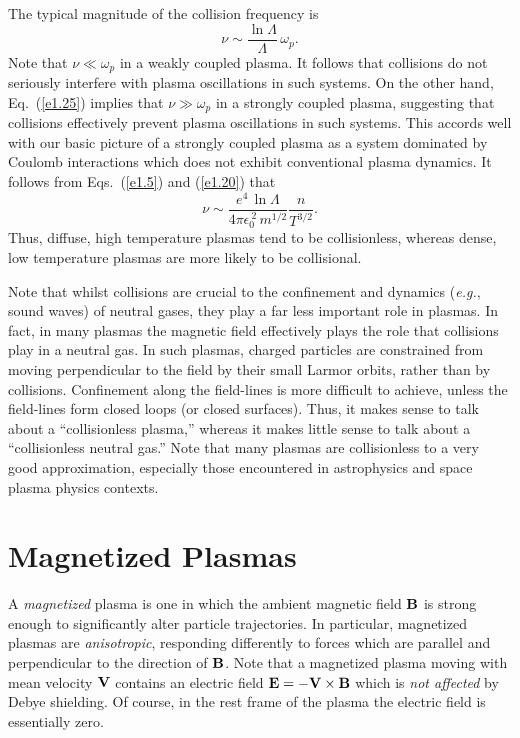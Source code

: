The typical magnitude of the collision frequency is
\begin{equation}\label{e1.25}
\nu \sim \frac{\ln{\Lambda}}{{\Lambda}}\,\omega_p.
\end{equation}
Note that $\nu\ll \omega_p$ in a weakly coupled plasma. It follows that
collisions do not seriously interfere with plasma oscillations in such systems.
On the other hand, Eq.~(\ref{e1.25}) implies that $\nu\gg \omega_p$ in a strongly
coupled plasma, suggesting that collisions effectively prevent plasma
oscillations in such systems. This accords well with our basic picture of a strongly
coupled plasma as a system 
dominated by Coulomb interactions which does not exhibit conventional
plasma dynamics.
It follows from Eqs.~(\ref{e1.5}) and (\ref{e1.20}) that
\begin{equation}
\nu \sim \frac{e^4\,\ln{\Lambda}}{4\pi\epsilon_0^{~2}\, m^{1/2}}
\frac{n}{T^{3/2}}.
\end{equation}
Thus, diffuse, high temperature plasmas tend to be collisionless, whereas dense,
low temperature plasmas are more likely to be collisional. 

Note that whilst collisions are crucial to the confinement and dynamics ({\em e.g.},
sound waves) of neutral gases, they play a far less important role in plasmas. 
In fact, in many plasmas the magnetic field effectively plays the role that 
collisions play in a neutral gas. In such plasmas, charged particles are
constrained from moving perpendicular to the field by their small Larmor
orbits, rather than by collisions. Confinement along the field-lines is
more difficult to achieve, unless the field-lines form closed loops
(or closed surfaces). Thus, it makes sense to talk about a
``collisionless plasma,'' whereas it makes little sense to talk about
a ``collisionless neutral gas.'' Note that many plasmas are collisionless to
a very good approximation, especially those encountered in astrophysics and space plasma
physics contexts. 

\section{Magnetized Plasmas}
A {\em magnetized}\/ plasma is one in which the ambient magnetic field
${\bf B}$ is strong enough to significantly alter particle
trajectories. In particular,
magnetized plasmas are {\em anisotropic}, responding differently to
forces which are parallel and perpendicular to the direction
of ${\bf B}$. Note that a magnetized plasma moving with
mean velocity ${\bf V}$ contains an electric field
${\bf E} = - {\bf V}\times {\bf B}$ which is {\em not affected}\/
by Debye shielding. Of course, in the rest frame of the plasma the electric
field is essentially zero. 

